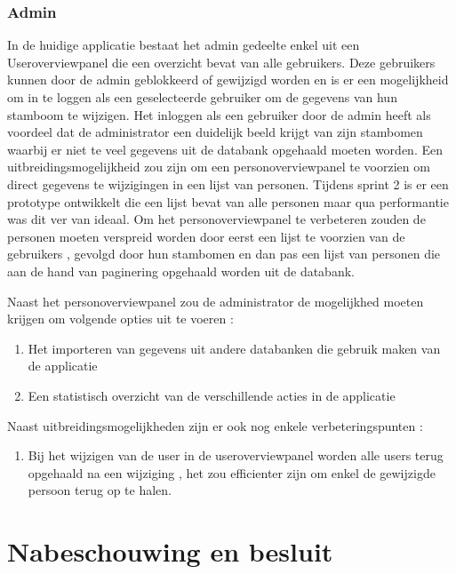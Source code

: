 \documentclass[pdftex,a4paper,12pt,twoside]{report}
\begin{document}
\subsection{Admin}

In de huidige applicatie bestaat het admin gedeelte enkel uit een Useroverviewpanel die een overzicht bevat van alle gebruikers.
Deze gebruikers kunnen door de admin geblokkeerd of gewijzigd worden en is er een mogelijkheid om in te loggen als een geselecteerde gebruiker om de gegevens van hun stamboom te wijzigen.
Het inloggen als een gebruiker door de admin heeft als voordeel dat de administrator een duidelijk beeld krijgt van zijn stambomen waarbij er niet te veel gegevens uit de databank opgehaald moeten worden.
Een uitbreidingsmogelijkheid zou zijn om een personoverviewpanel te voorzien om direct gegevens te wijzigingen in een lijst van personen.
Tijdens sprint 2 is er een prototype ontwikkelt die een lijst bevat van alle personen maar qua performantie was dit ver van ideaal.
Om het personoverviewpanel te verbeteren zouden de personen moeten verspreid worden door eerst een lijst te voorzien van de gebruikers , gevolgd door hun stambomen en dan pas een lijst van personen die aan de hand van paginering opgehaald worden uit de databank. 

Naast het personoverviewpanel zou de administrator de mogelijkhed moeten krijgen om volgende opties uit te voeren :
\begin{enumerate}
\item \label{it:first} Het importeren van gegevens uit andere databanken die gebruik maken van de applicatie
\item \label{it:first} Een statistisch overzicht van de verschillende acties in de applicatie
\end{enumerate}









Naast uitbreidingsmogelijkheden zijn er ook nog enkele verbeteringspunten :

\begin{enumerate}
\item \label{it:first} Bij het wijzigen van de user in de useroverviewpanel worden alle users terug opgehaald na een wijziging , het zou efficienter zijn om enkel de gewijzigde persoon terug op te halen.
\end{enumerate}



\chapter{Nabeschouwing en besluit}
\end{document}
